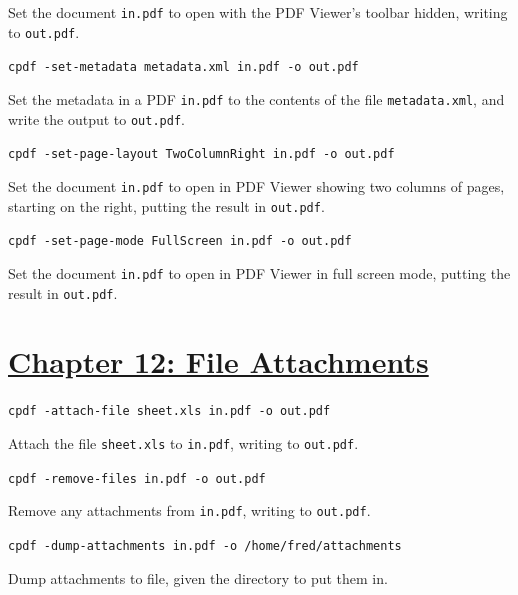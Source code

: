 \documentclass{book}
\begin{document}
\noindent Set the document \texttt{in.pdf} to open with the PDF Viewer's toolbar hidden, writing to \texttt{out.pdf}.

\begin{framed}\noindent\texttt{cpdf -set-metadata metadata.xml in.pdf -o out.pdf}\end{framed}

\noindent Set the metadata in a PDF \texttt{in.pdf} to the contents of the file \texttt{metadata.xml}, and write the output to \texttt{out.pdf}.

\begin{framed}\noindent\texttt{cpdf -set-page-layout TwoColumnRight in.pdf -o out.pdf}\end{framed}

\noindent Set the document \texttt{in.pdf} to open in PDF Viewer showing two columns of pages, starting on the right, putting the result in \texttt{out.pdf}.

\begin{framed}\noindent\texttt{cpdf -set-page-mode FullScreen in.pdf -o out.pdf}\end{framed}

\noindent Set the document \texttt{in.pdf} to open in PDF Viewer in full screen mode, putting the result in \texttt{out.pdf}.

\section*{\hyperref[chap:12]{Chapter 12: File Attachments}}

\begin{framed}\noindent\texttt{cpdf -attach-file sheet.xls in.pdf -o out.pdf}\end{framed}

\noindent Attach the file \texttt{sheet.xls} to \texttt{in.pdf}, writing to \texttt{out.pdf}.

\begin{framed}\noindent\texttt{cpdf -remove-files in.pdf -o out.pdf}\end{framed}

\noindent Remove any attachments from \texttt{in.pdf}, writing to \texttt{out.pdf}.

\begin{framed}\noindent\texttt{cpdf -dump-attachments in.pdf -o /home/fred/attachments}\end{framed}

\noindent Dump attachments to file, given the directory to put them in.
\end{document}
